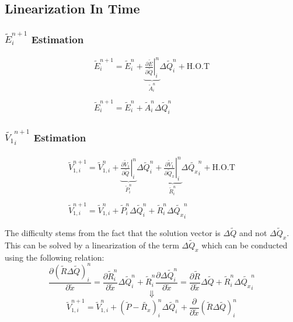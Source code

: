\documentclass[11pt, a4paper]{article}
\newcommand{\parder}[2]{\frac{\partial {#1}}{\partial {#2}}}
\begin{document}
\subsection{Linearization In Time}
\subsubsection{$\tilde{E}_i^{n+1}$ Estimation}
\begin{equation}
    \begin{array}{c}
        \displaystyle\tilde{E}_i^{n+1}=\tilde{E}_i^{n}+\underbrace{\left.\parder{\tilde{E}}{\tilde{Q}}\right|_i^n}_{\displaystyle\tilde{A}_i^n}\Delta\tilde{Q}_i^n+\mathrm{H.O.T} \\\\
        \displaystyle\tilde{E}_i^{n+1}=\tilde{E}_i^{n}+\tilde{A}_i^n\Delta\tilde{Q}_i^n
    \end{array}
\end{equation}

\subsubsection{$\tilde{V_1}_{i}^{n+1}$ Estimation}
\begin{equation}
    \begin{array}{c}
        \displaystyle\tilde{V}_{1,i}^{n+1}=\tilde{V}_{1,i}^{n}+\underbrace{\left.\parder{\tilde{V}_1}{\tilde{Q}}\right|_i^n}_{\displaystyle\tilde{P}_i^n}\Delta\tilde{Q}_i^n+\underbrace{\left.\parder{\tilde{V}_1}{\tilde{Q}_x}\right|_i^n}_{\displaystyle\tilde{R}_i^n}\Delta\tilde{Q_x}_i^n+\mathrm{H.O.T} \\\\
        \displaystyle\tilde{V}_{1,i}^{n+1}=\tilde{V}_{1,i}^{n}+\tilde{P}_i^n\Delta\tilde{Q}_i^n+\tilde{R}_i^n\Delta\tilde{Q_x}_i^n \\\\
    \end{array}
\end{equation}
The difficulty stems from the fact that the solution vector is $\Delta\tilde{Q}$ and not $\Delta\tilde{Q}_x$. This can be solved by a linearization of the term $\Delta\tilde{Q}_x$ which can be conducted using the following relation:
\begin{equation*}
    \parder{\left(\tilde{R}\Delta\tilde{Q}\right)_i^n}{\tilde{x}}=\parder{\tilde{R}_i^n}{\tilde{x}}\Delta\tilde{Q}_i^n+\tilde{R}_i^n\parder{\Delta\tilde{Q}_i^n}{\tilde{x}}=\parder{\tilde{R}}{\tilde{x}}\Delta\tilde{Q}+\tilde{R}_i^n\Delta\tilde{Q_x}_i^n 
\end{equation*}
$$\Downarrow$$
\begin{equation}
    \displaystyle\tilde{V}_{1,i}^{n+1}=\tilde{V}_{1,i}^{n}+\left(\tilde{P}-\tilde{R_x}\right)_i^n\Delta\tilde{Q}_i^n+\parder{}{\tilde{x}}\left(\tilde{R}\Delta\tilde{Q}\right)_i^n 
\end{equation}
\end{document}
